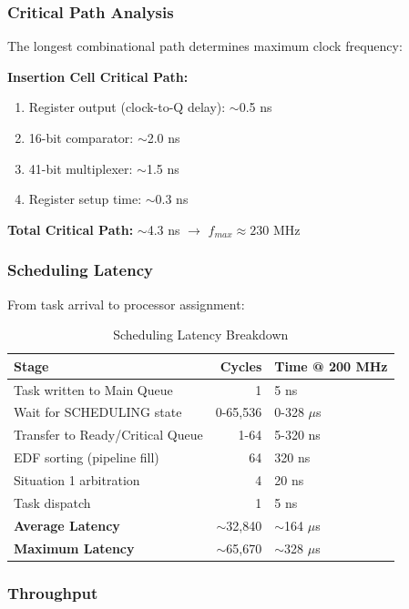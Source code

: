\documentclass[12pt,a4paper]{article}
\begin{document}
\subsubsection{Critical Path Analysis}

The longest combinational path determines maximum clock frequency:

\textbf{Insertion Cell Critical Path:}
\begin{enumerate}
    \item Register output (clock-to-Q delay): $\sim$0.5 ns
    \item 16-bit comparator: $\sim$2.0 ns
    \item 41-bit multiplexer: $\sim$1.5 ns
    \item Register setup time: $\sim$0.3 ns
\end{enumerate}

\textbf{Total Critical Path:} $\sim$4.3 ns $\rightarrow$ $f_{max} \approx 230$ MHz

\subsubsection{Scheduling Latency}

From task arrival to processor assignment:

\begin{table}[H]
\centering
\begin{tabular}{|l|r|l|}
\hline
\textbf{Stage} & \textbf{Cycles} & \textbf{Time @ 200 MHz} \\
\hline
Task written to Main Queue & 1 & 5 ns \\
Wait for SCHEDULING state & 0-65,536 & 0-328 $\mu$s \\
Transfer to Ready/Critical Queue & 1-64 & 5-320 ns \\
EDF sorting (pipeline fill) & 64 & 320 ns \\
Situation 1 arbitration & 4 & 20 ns \\
Task dispatch & 1 & 5 ns \\
\hline
\textbf{Average Latency} & $\sim$32,840 & $\sim$164 $\mu$s \\
\textbf{Maximum Latency} & $\sim$65,670 & $\sim$328 $\mu$s \\
\hline
\end{tabular}
\caption{Scheduling Latency Breakdown}
\end{table}

\subsubsection{Throughput}
\end{document}
